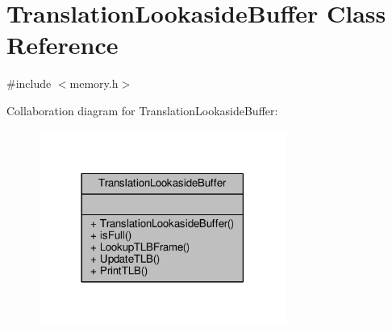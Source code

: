 \hypertarget{classTranslationLookasideBuffer}{}\section{Translation\+Lookaside\+Buffer Class Reference}
\label{classTranslationLookasideBuffer}


{\ttfamily \#include $<$memory.\+h$>$}



Collaboration diagram for Translation\+Lookaside\+Buffer\+:
\nopagebreak
\begin{figure}[H]
\begin{center}
\leavevmode
\includegraphics[width=230pt]{classTranslationLookasideBuffer__coll__graph}
\end{center}
\end{figure}
